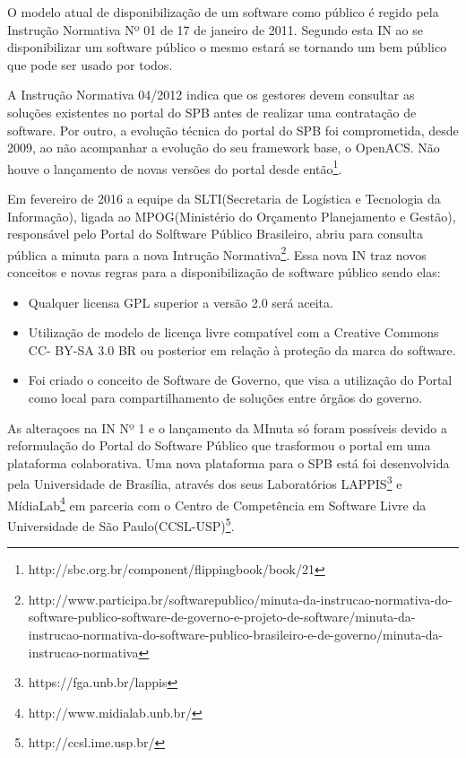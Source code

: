 O modelo atual de disponibilização de um software como público é
regido pela Instrução Normativa Nº 01 de 17 de janeiro de 2011. 
Segundo esta IN ao se disponibilizar um software público o mesmo estará se tornando um bem público
que pode ser usado por todos.

A Instrução Normativa 04/2012 indica que os gestores devem consultar as soluções 
existentes no portal do SPB antes de realizar uma contratação de software. Por outro,
a evolução técnica do portal do SPB foi comprometida, desde 2009, ao não acompanhar 
a evolução do seu framework base, o OpenACS. Não houve o lançamento de novas versões do
portal desde então\footnote{http://sbc.org.br/component/flippingbook/book/21}.

Em fevereiro de 2016 a equipe da SLTI(Secretaria de Logística e Tecnologia da Informação), ligada ao
MPOG(Ministério do Orçamento Planejamento e Gestão), responsável pelo Portal do Solftware
Público Brasileiro, abriu para consulta pública a minuta para a nova Intrução 
Normativa\footnote{http://www.participa.br/softwarepublico/minuta-da-instrucao-normativa-do-software-publico-software-de-governo-e-projeto-de-software/minuta-da-instrucao-normativa-do-software-publico-brasileiro-e-de-governo/minuta-da-instrucao-normativa}.
Essa nova IN traz novos conceitos e novas regras para a disponibilização de software público sendo elas:

\begin{itemize}

\item Qualquer licensa GPL superior a versão 2.0 será aceita.

\item Utilização de modelo de licença livre compatível com a Creative Commons CC-
BY-SA 3.0 BR ou posterior em relação à proteção da marca do software.

\item Foi criado o conceito de Software de Governo, que visa a utilização do Portal
como local para compartilhamento de soluções entre órgãos do governo.

\end{itemize}

As alteraçoes na IN Nº 1 e o lançamento da MInuta só foram possíveis devido 
a reformulação do Portal do Software Público que trasformou o portal em uma 
plataforma colaborativa. Uma nova plataforma para o SPB está foi desenvolvida
pela Universidade de Brasília, através dos seus Laboratórios LAPPIS\footnote{https://fga.unb.br/lappis} 
e MídiaLab\footnote{http://www.midialab.unb.br/} 
em parceria com o Centro de Competência em Software Livre da Universidade de São Paulo(CCSL-USP)\footnote{http://ccsl.ime.usp.br/}.

